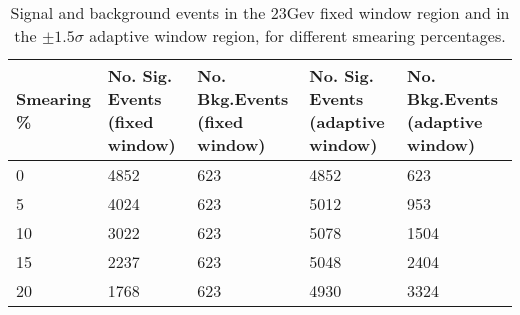 \begin{table}[h!]
\centering
\begin{tabular}{|p{2cm}|p{3cm}|p{3cm}|p{3cm}|p{3cm}|}
 \hline
Smearing \%  & No. Sig. Events (fixed window) & No. Bkg.Events (fixed window) & No. Sig. Events (adaptive window) & No. Bkg.Events (adaptive window)  \\
\hline
0 & 4852 & 623 & 4852 & 623  \\
5 & 4024 & 623  & 5012  & 953  \\
10 & 3022 & 623 & 5078 & 1504  \\
15 & 2237  & 623 &  5048 & 2404  \\
20 & 1768  & 623 & 4930 & 3324  \\
 \hline
\end{tabular}
\caption{Signal and background events in the 23Gev fixed window region and in the $\pm 1.5\sigma$ adaptive window region, for different smearing percentages.}
\label{table:NumSigBkg}
\end{table}
